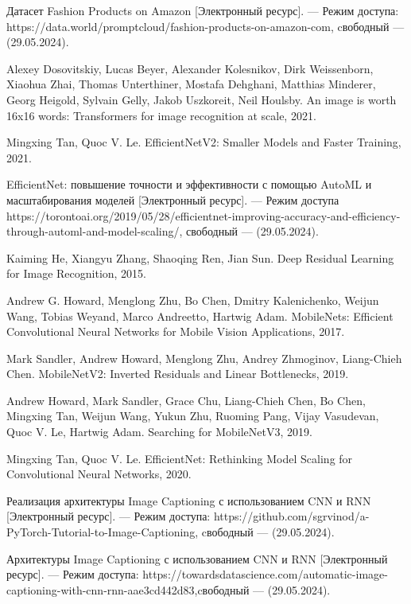 \begin{thebibliography}{0}
	Датасет Fashion Products on Amazon [Электронный ресурс]. — Режим доступа: https://data.world/promptcloud/fashion-products-on-amazon-com, cвободный — (29.05.2024).
	
	Alexey Dosovitskiy, Lucas Beyer, Alexander Kolesnikov, Dirk Weissenborn, Xiaohua Zhai, Thomas Unterthiner, Mostafa Dehghani, Matthias Minderer,
	Georg Heigold, Sylvain Gelly, Jakob Uszkoreit, Neil Houlsby. An image is worth 16x16 words: Transformers for image recognition at scale, 2021.
	
	Mingxing Tan, Quoc V. Le. EfficientNetV2: Smaller Models and Faster Training, 2021.
	
	EfficientNet: повышение точности и эффективности с помощью AutoML и масштабирования моделей [Электронный ресурс]. — Режим доступа https://torontoai.org/2019/05/28/efficientnet-improving-accuracy-and-efficiency-through-automl-and-model-scaling/, свободный — (29.05.2024).
	
	Kaiming He, Xiangyu Zhang, Shaoqing Ren, Jian Sun. Deep Residual Learning for Image Recognition, 2015.
	
	Andrew G. Howard, Menglong Zhu, Bo Chen, Dmitry Kalenichenko, Weijun Wang, Tobias Weyand, Marco Andreetto, Hartwig Adam. MobileNets: Efficient Convolutional Neural Networks for Mobile Vision Applications, 2017.
	
	Mark Sandler, Andrew Howard, Menglong Zhu, Andrey Zhmoginov, Liang-Chieh Chen. MobileNetV2: Inverted Residuals and Linear Bottlenecks, 2019.
	
	Andrew Howard, Mark Sandler, Grace Chu, Liang-Chieh Chen, Bo Chen, Mingxing Tan,
	Weijun Wang, Yukun Zhu, Ruoming Pang, Vijay Vasudevan, Quoc V. Le, Hartwig Adam. Searching for MobileNetV3, 2019.
	
	Mingxing Tan, Quoc V. Le. EfficientNet: Rethinking Model Scaling for Convolutional Neural Networks, 2020.
	
	Реализация архитектуры Image Captioning с использованием CNN и RNN [Электронный ресурс]. — Режим доступа: https://github.com/sgrvinod/a-PyTorch-Tutorial-to-Image-Captioning, cвободный — (29.05.2024).
	
	Архитектуры Image Captioning с использованием CNN и RNN [Электронный ресурс]. — Режим доступа: https://towardsdatascience.com/automatic-image-captioning-with-cnn-rnn-aae3cd442d83,cвободный — (29.05.2024).
	

\end{thebibliography}
